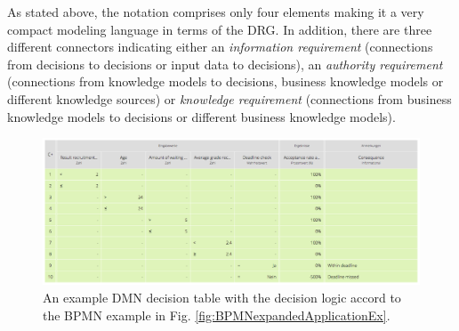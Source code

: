 As stated above, the notation comprises only four elements making it a very compact modeling language in terms of the \ac{DRG}. In addition, there are three different connectors indicating either an \textit{information requirement} (connections from decisions to decisions or input data to decisions), an \textit{authority requirement} (connections from knowledge models to decisions, business knowledge models or different knowledge sources) or \textit{knowledge requirement} (connections from business knowledge models to decisions or different business knowledge models). 

\begin{figure}
\includegraphics[width=\textwidth]{../figures/chapter_indicators/DMN_Application_Example_Decision_Table_ToR.png} 
\caption{An example DMN decision table with the decision logic accord to the BPMN example in Fig. \ref{fig:BPMNexpandedApplicationEx}.}
\label{fig:DMN_decision_table_application}
\end{figure}

